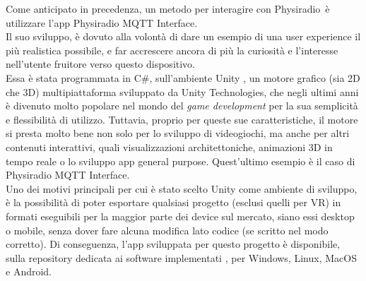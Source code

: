\documentclass[12pt,a4paper]{report}
\newcommand{\physiradio}{Physiradio} %
\begin{document}
Come anticipato in precedenza, un metodo per interagire con \physiradio\ è utilizzare l'app Physiradio MQTT Interface.\\
Il suo sviluppo, è dovuto alla volontà di dare un esempio di una user experience il più realistica possibile, e far accrescere ancora di più la curiosità e l'interesse nell'utente fruitore verso questo dispositivo. \\
Essa è stata programmata in C\#, sull'ambiente Unity \cite{unity}, un motore grafico (sia 2D che 3D) multipiattaforma sviluppato da Unity Technologies, che negli ultimi anni è divenuto molto popolare nel mondo del \textit{game development} per la sua semplicità e flessibilità di utilizzo.
Tuttavia, proprio per queste sue caratteristiche, il motore si presta molto bene non solo per lo sviluppo di videogiochi, ma anche per altri contenuti interattivi, quali visualizzazioni architettoniche, animazioni 3D in tempo reale o lo sviluppo app general purpose. Quest'ultimo esempio è il caso di Physiradio MQTT Interface. \\
Uno dei motivi principali per cui è stato scelto Unity come ambiente di sviluppo, è la possibilità di poter esportare qualsiasi progetto (esclusi quelli per VR) in formati eseguibili per la maggior parte dei device sul mercato, siano essi desktop o mobile, senza dover fare alcuna modifica lato codice (se scritto nel modo corretto). Di conseguenza, l'app sviluppata per questo progetto è disponibile, sulla repository dedicata ai software implementati \cite{repositorySwOnly}, per Windows, Linux, MacOS e Android. 

\end{document}
